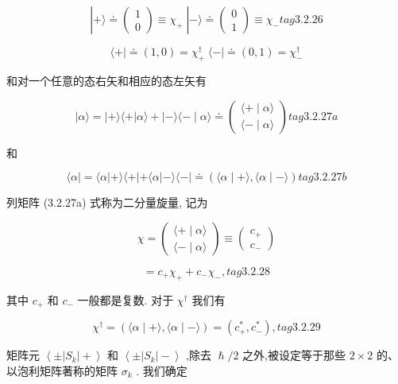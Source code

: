 $$
\left| {+\rangle \doteq \left( \begin{array}{l} 1 \\ 0 \end{array}\right) \equiv {\chi }_{ + }\;}\right| - \rangle \doteq \left( \begin{array}{l} 0 \\ 1 \end{array}\right) \equiv {\chi }_{ - } tag{3.2.26}
$$

$$
\langle + \mid \doteq \left( {1,0}\right) = {\chi }_{ + }^{ \dagger }\;\langle - \mid \doteq \left( {0,1}\right) = {\chi }_{ - }^{ \dagger }
$$

和对一个任意的态右矢和相应的态左矢有

$$
\left| {\alpha \rangle = }\right| + \rangle \langle + \left| {\alpha \rangle + }\right| - \rangle \langle - \mid \alpha \rangle \doteq \left( \begin{array}{l} \langle + \mid \alpha \rangle \\ \langle - \mid \alpha \rangle \end{array}\right) tag{3.2.27a}
$$

和

$$
\langle \alpha \left| { = \langle \alpha }\right| + \rangle \langle + \left| {+\langle \alpha }\right| - \rangle \langle - | \doteq \left( {\langle \alpha \mid + \rangle ,\langle \alpha \mid - \rangle }\right) tag{3.2.27b}
$$

列矩阵 (3.2.27a) 式称为二分量旋量, 记为

$$
\chi = \left( \begin{array}{l} \langle + \mid \alpha \rangle \\ \langle - \mid \alpha \rangle \end{array}\right) \equiv \left( \begin{array}{l} {c}_{ + } \\ {c}_{ - } \end{array}\right)
$$

$$
= {c}_{ + }{\chi }_{ + } + {c}_{ - }{\chi }_{ - }, tag{3.2.28}
$$


其中 ${c}_{ + }$ 和 ${c}_{ - }$ 一般都是复数. 对于 ${\chi }^{ \dagger }$ 我们有

$$
{\chi }^{ \dagger } = \left( {\langle \alpha \mid + \rangle ,\langle \alpha \mid - \rangle }\right) = \left( {{c}_{ + }^{ * },{c}_{ - }^{ * }}\right) , tag{3.2.29}
$$

矩阵元 $\left\langle {\pm \left| {S}_{k}\right| + }\right\rangle$ 和 $\left\langle {\pm \left| {S}_{k}\right| - }\right\rangle$ ,除去 $\hslash /2$ 之外,被设定等于那些 $2 \times 2$ 的、以泡利矩阵著称的矩阵 ${\sigma }_{k}$ . 我们确定


